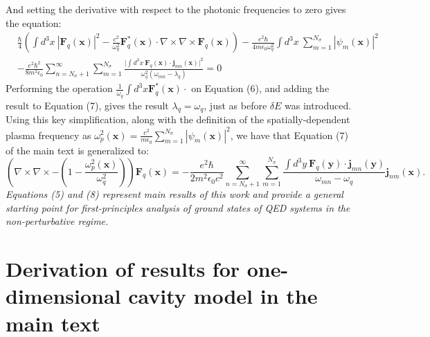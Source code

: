\documentclass[aps,prb,onecolumn,preprint,
	groupedaddress,superscriptaddress,
	amsfonts,amssymb,amsmath,floatfix,
	citeautoscript]{revtex4-1}
\begin{document}
And setting the derivative with respect to the photonic frequencies to zero gives the equation:
\begin{align}
&\frac{\hbar}{4}\left(\int d^3x ~|\mathbf{F}_q(\mathbf{x})|^2 - \frac{c^2}{\omega_q^2}\mathbf{F}^*_q(\mathbf{x})\cdot\nabla\times\nabla\times\mathbf{F}_q(\mathbf{x}) \right) - \frac{e^2\hbar}{4m\epsilon_0\omega_q^2}\int d^3x~\sum\limits_{m=1}^{N_{\sigma}} |\psi_m(\mathbf{x})|^2 \nonumber \\ &-\frac{e^2\hbar^2}{8m^2\epsilon_0}\sum\limits_{n=N_{\sigma}+1}^{\infty}\sum\limits_{m=1}^{N_{\sigma}}\frac{\Big|\int d^3x~\mathbf{F}_q(\mathbf{x})\cdot\mathbf{j}_{mn}(\mathbf{x})\Big|^2}{\omega_q^2(\omega_{mn}-\lambda_q)}=  0 
\end{align}
Performing the operation $\frac{1}{\omega_q}\int d^3x \mathbf{F}_q^*(\mathbf{x})  \cdot$ on Equation (6), and adding the result to Equation (7), gives the result $\lambda_q = \omega_q$, just as before $\delta E$ was introduced. Using this key simplification, along with the definition of the spatially-dependent plasma frequency as $\omega_p^2(\mathbf{x}) = \frac{e^2}{m\epsilon_0}\sum\limits_{m=1}^{N_{\sigma}}|\psi_m(\mathbf{x})|^2$, we have that Equation (7) of the main text is generalized to:
\begin{equation}
\left( \nabla\times\nabla\times - \left(1-\frac{\omega_p^2(\mathbf{x})}{\omega_q^2} \right)\right)\mathbf{F}_q(\mathbf{x}) = -\frac{e^2\hbar}{2m^2\epsilon_0c^2}\sum\limits_{n=N_{\sigma}+1}^{\infty}\sum\limits_{m=1}^{N_{\sigma}} \frac{\int d^3y~\mathbf{F}_q(\mathbf{y})\cdot\mathbf{j}_{mn}(\mathbf{y})}{\omega_{mn}-\omega_{q}}\mathbf{j}_{nm}(\mathbf{x}).
\end{equation}
\textit{Equations (5) and (8) represent main results of this work and provide a general starting point for first-principles analysis of ground states of QED systems in the non-perturbative regime.}

\section{Derivation of results for one-dimensional cavity model in the main text}
\end{document}
